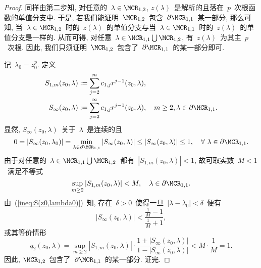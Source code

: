 \begin{proof}
同样由第二步知, 对任意的~$\lambda \in \MCR_{1,2}$,
$z(\lambda)$~是解析的且落在~$p$~次根函数的单值分支中. 于是,
若我们能证明~$\MCR_{1,2}$~包含~$\partial\MCR_{1,1}$~某一部分,
那么可知, 当~$\lambda \in
\MCR_{1,2}$~时的~$z(\lambda)$~的单值分支与当~$\lambda \in
\MCR_{1,1}$~时的~$z(\lambda)$~的单值分支是一样的. 从而可得,
对任意~$\lambda \in \MCR_{1,1} \bigcup\MCR_{1,2}$,
有~$z(\lambda)$~为其主~$p$~次根. 因此,
我们只须证明~$\MCR_{1,2}$~包含了~$\partial\MCR_{1,1}$~的某一部分即可.


记~$\lambda_0 = z_0^p$. 定义
\begin{align*}
S_{1,m}(z_0,\lambda) & := \sum\limits_{j=2}^m
c_{1,j}r^{j-1}(z_0,\lambda), \\
S_\infty(z_0,\lambda) & := \sum\limits_{j=2}^\infty
c_{1,j}r^{j-1}(z_0,\lambda), \quad m \geq 2, \lambda \in
\partial\MCR_{1,1}.
\end{align*}
显然, $S_\infty(z_0,\lambda)$~关于~$\lambda$~是连续的且
\begin{equation}
\label{ineq:S(z0,lambda0)} 0 = \left|S_\infty(z_0,\lambda_0)\right|
= \min_{\lambda \in
\partial\MCR_{1,1}}\left|S_\infty(z_0,\lambda)\right| \leq
\left|S_\infty(z_0,\lambda)\right| \leq 1, \ \ \ \forall \ \lambda
\in
\partial\MCR_{1,1}.
\end{equation}
由于对任意的~$\lambda \in
\MCR_{1,1}\bigcup\MCR_{1,2}$~都有~$|S_{1,m}(z_0,\lambda)|<1$,
故可取实数~$M < 1$~满足不等式
$$
\sup_{m\geq2}\left|S_{1,m}(z_0,\lambda)\right| < M, \ \ \ \lambda
\in
\partial\MCR_{1,1}.
$$
由~(\ref{ineq:S(z0,lambda0)})~知, 存在~$\delta >
0$~使得一旦~$|\lambda - \lambda_0| < \delta$~便有
$$
 \left|S_\infty(z_0,\lambda)\right| <
 \frac{\frac{1}{M}-1}{\frac{1}{M} + 1},
$$
或其等价情形
$$
q_2(z_0,\lambda) = \sup_{m\geq 2}|S_{1,m}(z_0,\lambda)|\cdot
\frac{1+|S_\infty(z_0,\lambda)|}{1-|S_\infty(z_0,\lambda)|} < M
\cdot \frac{1}{M} = 1.
$$
因此, $\MCR_{1,2}$~包含了~$\partial\MCR_{1,1}$~的某一部分. 证完.
\end{proof}


%


